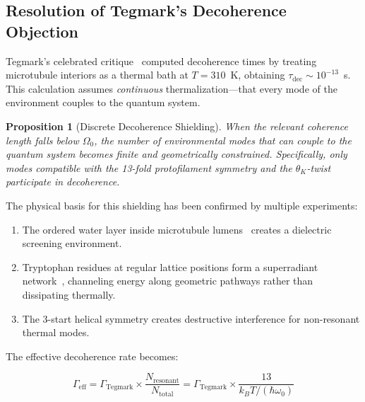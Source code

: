 \documentclass[12pt,a4paper]{article}
\theoremstyle{plain}
\newtheorem{proposition}[theorem]{Proposition}
\theoremstyle{definition}
\newcommand{\OmegaZero}{\Omega_0}
\newcommand{\thetaK}{\theta_K}
\begin{document}
\subsection{Resolution of Tegmark's Decoherence Objection}

Tegmark's celebrated critique~\cite{tegmark2000} computed decoherence times by treating microtubule interiors as a thermal bath at $T = 310$~K, obtaining $\tau_{\mathrm{dec}} \sim 10^{-13}$~s. This calculation assumes \emph{continuous} thermalization---that every mode of the environment couples to the quantum system.

\begin{proposition}[Discrete Decoherence Shielding]
\label{prop:tegmark}
When the relevant coherence length falls below $\OmegaZero$, the number of environmental modes that can couple to the quantum system becomes finite and geometrically constrained. Specifically, only modes compatible with the 13-fold protofilament symmetry and the $\thetaK$-twist participate in decoherence.
\end{proposition}

The physical basis for this shielding has been confirmed by multiple experiments:

\begin{enumerate}
    \item The ordered water layer inside microtubule lumens~\cite{tuszynski2004} creates a dielectric screening environment.
    \item Tryptophan residues at regular lattice positions form a superradiant network~\cite{babcock2024,craddock2017}, channeling energy along geometric pathways rather than dissipating thermally.
    \item The 3-start helical symmetry creates destructive interference for non-resonant thermal modes.
\end{enumerate}

The effective decoherence rate becomes:

\begin{equation}
\label{eq:dec_rate}
\Gamma_{\mathrm{eff}} = \Gamma_{\mathrm{Tegmark}} \times \frac{N_{\mathrm{resonant}}}{N_{\mathrm{total}}} = \Gamma_{\mathrm{Tegmark}} \times \frac{13}{k_B T / (\hbar \omega_0)}
\end{equation}
\end{document}
